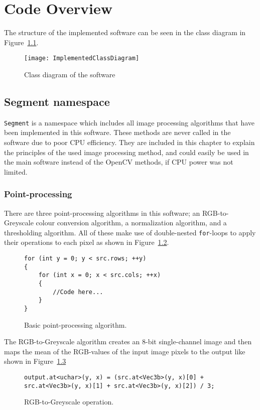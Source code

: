 \chapter{Code Overview}\label{ch:codeover}

The structure of the implemented software can be seen in the class diagram in Figure~\ref{fig:implementedClassDiagram}.

\begin{figure}
	\centering
	\texttt{[image: ImplementedClassDiagram]}
	\caption{Class diagram of the software \label{fig:implementedClassDiagram}}
	
\end{figure}


\section{Segment namespace}
\texttt{Segment} is a namespace which includes all image processing algorithms that have been implemented in this software. These methods are never called in the software due to poor CPU efficiency. They are included in this chapter to explain the principles of the used image processing method, and could easily be used in the main software instead of the OpenCV methods, if CPU power was not limited.

\subsection{Point-processing}
There are three point-processing algorithms in this software; an RGB-to-Greyscale colour conversion algorithm, a normalization algorithm, and a thresholding algorithm. All of these make use of double-nested \texttt{for}-loops to apply their operations to each pixel as shown in Figure~\ref{fig:pointprocess}.
\begin{figure}[!h]
\begin{lstlisting}
for (int y = 0; y < src.rows; ++y)
{
	for (int x = 0; x < src.cols; ++x)
	{
		//Code here...
	}
}
\end{lstlisting}
\caption{Basic point-processing algorithm. \label{fig:pointprocess}}
\end{figure} 

The RGB-to-Greyscale algorithm creates an 8-bit single-channel image and then maps the mean of the RGB-values of the input image pixels to the output like shown in Figure~\ref{fig:rgb2gray}

\begin{figure}[!h]
\begin{lstlisting}
output.at<uchar>(y, x) = (src.at<Vec3b>(y, x)[0] + src.at<Vec3b>(y, x)[1] + src.at<Vec3b>(y, x)[2]) / 3;
\end{lstlisting}
\caption{RGB-to-Greyscale operation.\label{fig:rgb2gray}}
\end{figure}

